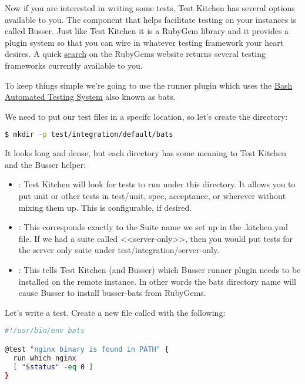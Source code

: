 Now if you are interested in writing some tests, Test Kitchen has several options available to you. The component that helps facilitate testing on your instances is called Busser. Just like Test Kitchen it is a RubyGem library and it provides a plugin system so that you can wire in whatever testing framework your heart desires. A quick \href{https://rubygems.org/search?utf8=%E2%9C%93&amp;query=busser-}{search} on the RubyGems website returns several testing frameworks currently available to you.

To keep things simple we're going to use the  runner plugin which uses the \href{https://github.com/sstephenson/bats}{Bash Automated Testing System} also known as bats.

We need to put our test files in a specifc location, so let's create the directory:

\begin{lstlisting}[language=Bash,label=lst:testing-test-kitchen13]
$ mkdir -p test/integration/default/bats
\end{lstlisting}

It looks long and dense, but each directory has some meaning to Test Kitchen and the Busser helper:

\begin{itemize}
  \item {}: Test Kitchen will look for tests to run under this directory. It allows you to put unit or other tests in test/unit, spec, acceptance, or wherever without mixing them up. This is configurable, if desired.
  \item {}: This corresponds exactly to the Suite name we set up in the .kitchen.yml file. If we had a suite called <<server-only>>, then you would put tests for the server only suite under test/integration/server-only.
  \item {}: This tells Test Kitchen (and Busser) which Busser runner plugin needs to be installed on the remote instance. In other words the bats directory name will cause Busser to install busser-bats from RubyGems.
\end{itemize}

Let's write a test. Create a new file called  with the following:

\begin{lstlisting}[language=Bash,label=lst:testing-test-kitchen14]
#!/usr/bin/env bats

@test "nginx binary is found in PATH" {
  run which nginx
  [ "$status" -eq 0 ]
}
\end{lstlisting}

